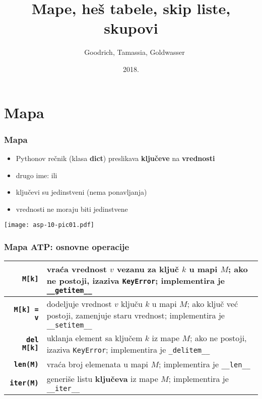 \documentclass[compress]{beamer}
\title{Mape, heš tabele, skip liste, skupovi}
\author{\textcopyright \ \ Goodrich, Tamassia, Goldwasser}
\institute{Katedra za informatiku, Fakultet tehničkih nauka, Univerzitet u
Novom Sadu}
\date{2018.}
\begin{document}
\frame{\titlepage}

\section[Mapa]{Mapa}
\begin{frame}[fragile]
  \frametitle{Mapa}
  \begin{itemize}
    \item Pythonov rečnik (klasa \textbf{dict}) preslikava \textbf{ključeve} na \textbf{vrednosti} 
    \item drugo ime:  ili 
    \item ključevi su jedinstveni (nema ponavljanja)
    \item vrednosti ne moraju biti jedinstvene
  \end{itemize}
  \begin{center}
    \texttt{[image: asp-10-pic01.pdf]}
  \end{center}
\end{frame}

\begin{frame}[fragile]
  \frametitle{Mapa ATP: osnovne operacije}
  \begin{center}
    \begin{tabular}{rp{8cm}}
      \textbf{\texttt{M[k]}} & vraća vrednost $v$ vezanu za ključ $k$ u mapi $M$; ako ne postoji, izaziva \texttt{KeyError}; implementira je \texttt{\_\_getitem\_\_} \\ \hline
      \textbf{\texttt{M[k] = v}} & dodeljuje vrednost $v$ ključu $k$ u mapi $M$; ako ključ već postoji, zamenjuje staru vrednost; implementira je \texttt{\_\_setitem\_\_} \\ \hline
      \textbf{\texttt{del M[k]}} & uklanja element sa ključem $k$ iz mape $M$; ako ne postoji, izaziva \texttt{KeyError}; implementira je \texttt{\_delitem\_\_} \\ \hline
      \textbf{\texttt{len(M)}} & vraća broj elemenata u mapi $M$; implementira je \texttt{\_\_len\_\_} \\ \hline
      \textbf{\texttt{iter(M)}} & generiše listu \textbf{ključeva} iz mape $M$;  implementira je \texttt{\_\_iter\_\_} \\
    \end{tabular}
  \end{center}
\end{frame}
\end{document}
